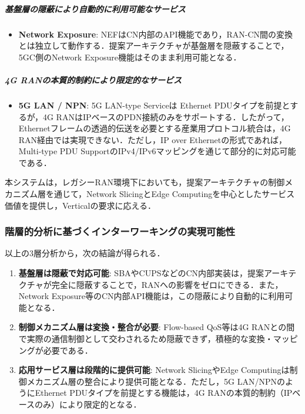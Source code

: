 \subparagraph{基盤層の隠蔽により自動的に利用可能なサービス}

\begin{itemize}
\item \textbf{Network Exposure}: NEFはCN内部のAPI機能であり，RAN-CN間の変換とは独立して動作する．提案アーキテクチャが基盤層を隠蔽することで，5GC側のNetwork Exposure機能はそのまま利用可能となる．
\end{itemize}

\subparagraph{4G RANの本質的制約により限定的なサービス}

\begin{itemize}
\item \textbf{5G LAN / NPN}: 5G LAN-type Serviceは Ethernet PDUタイプを前提とするが，4G RANはIPベースのPDN接続のみをサポートする．したがって，Ethernetフレームの透過的伝送を必要とする産業用プロトコル統合は，4G RAN経由では実現できない．ただし，IP over Ethernetの形式であれば，Multi-type PDU SupportのIPv4/IPv6マッピングを通じて部分的に対応可能である．
\end{itemize}

本システムは，レガシーRAN環境下においても，提案アーキテクチャの制御メカニズム層を通じて，Network SlicingとEdge Computingを中心としたサービス価値を提供し，Verticalの要求に応える．

\subsubsection{階層的分析に基づくインターワーキングの実現可能性}

以上の3層分析から，次の結論が得られる．

\begin{enumerate}
\item \textbf{基盤層は隠蔽で対応可能}: SBAやCUPSなどのCN内部実装は，提案アーキテクチャが完全に隠蔽することで，RANへの影響をゼロにできる．また，Network Exposure等のCN内部API機能は，この隠蔽により自動的に利用可能となる．

\item \textbf{制御メカニズム層は変換・整合が必要}: Flow-based QoS等は4G RANとの間で実際の通信制御として交わされるため隠蔽できず，積極的な変換・マッピングが必要である．

\item \textbf{応用サービス層は段階的に提供可能}: Network SlicingやEdge Computingは制御メカニズム層の整合により提供可能となる．ただし，5G LAN/NPNのようにEthernet PDUタイプを前提とする機能は，4G RANの本質的制約（IPベースのみ）により限定的となる．
\end{enumerate}

